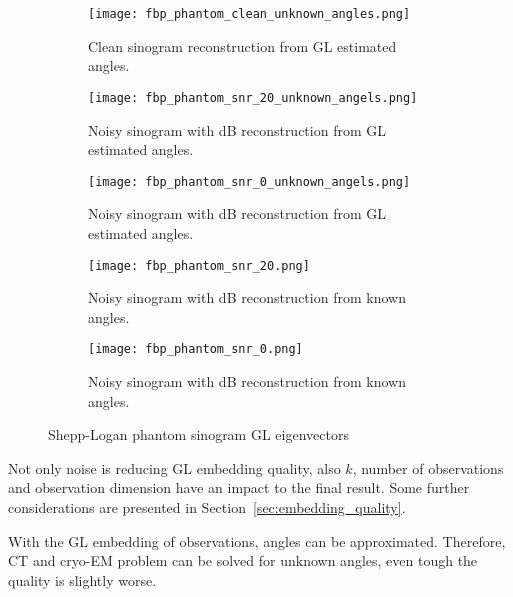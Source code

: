 \begin{figure}[H]
    \captionsetup[subfigure]{justification=centering}
    \centering
    \begin{subfigure}[t]{0.3\textwidth}
        \texttt{[image: fbp\_phantom\_clean\_unknown\_angles.png]}
        \caption{Clean sinogram reconstruction from GL estimated angles.}
        \label{fig:clean_reco_unknown}
    \end{subfigure}\hfill
    \begin{subfigure}[t]{0.3\textwidth}
      \texttt{[image: fbp\_phantom\_snr\_20\_unknown\_angels.png]}
      \caption{Noisy sinogram with  dB reconstruction from GL estimated angles.}
      \label{fig:noisy_snr20_reco_unknown}
    \end{subfigure}\hfill
    \begin{subfigure}[t]{0.3\textwidth}
      \texttt{[image: fbp\_phantom\_snr\_0\_unknown\_angels.png]}
      \caption{Noisy sinogram with  dB reconstruction from GL estimated angles.}
      \label{fig:noisy_snr0_reco_unknown}
    \end{subfigure}

    \begin{subfigure}[t]{0.3\textwidth}
      \texttt{[image: fbp\_phantom\_snr\_20.png]}
      \caption{Noisy sinogram with  dB reconstruction from known angles.}
      \label{fig:noisy_snr20_reco_known}
    \end{subfigure}\hfill
    \begin{subfigure}[t]{0.3\textwidth}
      \texttt{[image: fbp\_phantom\_snr\_0.png]}
      \caption{Noisy sinogram with  dB reconstruction from known angles.}
      \label{fig:noisy_snr0_reco_known}
    \end{subfigure}

    \caption{Shepp-Logan phantom sinogram GL eigenvectors}
    \label{fig:phantom_fbp_unknown_angles}
  \end{figure}

  Not only noise is reducing GL embedding quality, also $k$, number of observations 
  and observation dimension have an impact to the final result.
  Some further considerations are presented in Section~\ref{sec:embedding_quality}.

  \begin{tcolorbox}[colback=red!5!white,colframe=red!75!black]
    With the GL embedding of observations, angles can be approximated.
    Therefore, CT and cryo-EM problem can be solved for unknown angles, even tough the quality
    is slightly worse.
  \end{tcolorbox}

